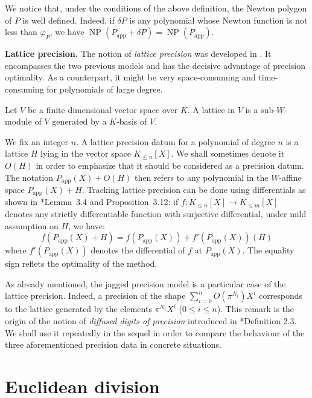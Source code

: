 \documentclass{sig-alternate-2013}
\DeclareMathOperator{\NP}{NP}
\newcommand{\app}{\textrm{app}}
\begin{document}
We notice that, under the conditions of the above definition, the
Newton polygon of $P$ is well defined. Indeed, if $\delta P$ is any
polynomial whose Newton function is not less than $\varphi_P$, we
have $\NP(P_\app + \delta P) = \NP(P_\app)$.

\medskip

\noindent
{\bf Lattice precision.}
The notion of \emph{lattice precision} was developed in 
\cite{caruso-roe-vaccon:14a}. It encompasses the two previous models and has
the decisive advantage of precision optimality.
 As a counterpart, it might be very space-consuming and time-consuming 
 for polynomials of large degree.

\begin{deftn}
Let $V$ be a finite dimensional vector space over $K$. A lattice
in $V$ is a sub-$W$-module of $V$ generated by a $K$-basis of
$V$.
\end{deftn}

\noindent
We fix an integer $n$. A lattice precision datum for a polynomial of 
degree $n$ is a lattice $H$ lying in the vector space $K_{\leq n}[X]$. 
We shall sometimes denote it $O(H)$ in order to emphasize that it should 
be considered as a precision datum. The notation $P_\app(X) + O(H)$ then 
refers to any polynomial in the $W$-affine space $P_\app(X) + H$. 
Tracking lattice precision can be done using differentials as shown in
\cite{caruso-roe-vaccon:14a}*{Lemma~3.4 and Proposition~3.12}: if $f : K_{\leq n}[X] 
\to K_{\leq m}[X]$ denotes any strictly differentiable function with
surjective differential, under mild assumption on $H$, we have:
$$f(P_\app(X)+H) = f(P_\app(X)) + f'(P_\app(X))(H)$$
where $f'(P_\app(X))$ denotes the differential of $f$ at $P_\app(X)$. 
The equality sign reflets the optimality of the method.

As already mentioned, the jagged precision model is a particular case of 
the lattice precision. Indeed, a precision of the shape $\sum_{i=0}^n 
O(\pi^{N_i}) X^i$ corresponds to the lattice generated by the elements 
$\pi^{N_i} X^i$ ($0 \leq i \leq n$). This remark is the origin of the 
notion of \emph{diffused digits of precision} introduced in 
\cite{caruso-roe-vaccon:15a}*{Definition 2.3}. We shall use it repeatedly in the 
sequel in order to compare the behaviour of the three aforementioned 
precision data in concrete situations.

\section{Euclidean division} \label{sec:quo_rem}
\end{document}
